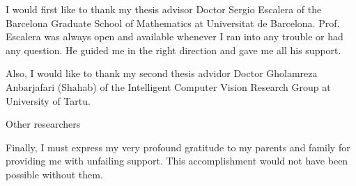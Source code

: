 
\begin{acknowledgements}

I would first like to thank my thesis advisor Doctor Sergio Escalera of the Barcelona Graduate School of Mathematics at Universitat de Barcelona. Prof. Escalera  was always open and available whenever I ran into any trouble or had any question. He guided me in the right direction and gave me all his support. 

Also, I would like to thank my second thesis advidor Doctor Gholamreza Anbarjafari (Shahab) of the Intelligent Computer Vision Research Group at University of Tartu.

Other researchers

Finally, I must express my very profound gratitude to my parents and family for providing me with unfailing support. This accomplishment would not have been possible without them.

\end{acknowledgements}